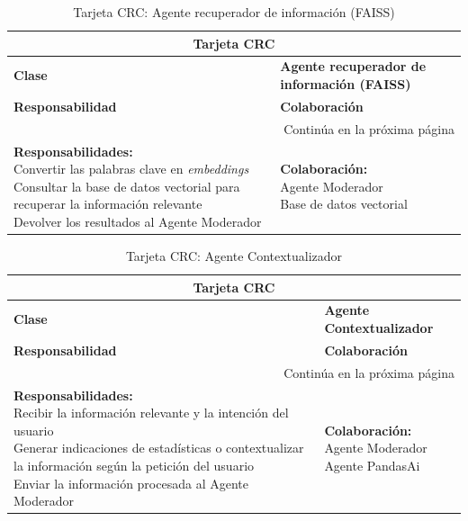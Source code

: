\begin{longtable}{|l|l|}
	\caption{Tarjeta CRC: Agente recuperador de información (FAISS) } \label{tablacrc2} \\
	
	\hline
	\multicolumn{2}{|c|}{\textbf{Tarjeta CRC}} \\
	\hline
	\textbf{Clase} & \textbf{Agente recuperador de información (FAISS)} \\
	\hline
	\endfirsthead
	
	\hline
	\textbf{Responsabilidad} & \textbf{Colaboración} \\
	\hline
	\endhead
	
	\hline
	\multicolumn{2}{|r|}{Continúa en la próxima página} \\
	\hline
	\endfoot
	
	\hline
	\endlastfoot
	
	\parbox[t]{0.45\linewidth}{\textbf{Responsabilidades:} \\ 
		Convertir las palabras clave en \textit{embeddings} \\ 
		Consultar la base de datos vectorial para recuperar la información relevante \\ 
		Devolver los resultados al Agente Moderador} 
	& 
	\parbox[t]{0.45\linewidth}{\textbf{Colaboración:} \\
		Agente Moderador \\ 
		Base de datos vectorial}
\end{longtable}

\begin{longtable}{|l|l|}
	\caption{Tarjeta CRC: Agente Contextualizador} \label{tablacrc3} \\
	
	\hline
	\multicolumn{2}{|c|}{\textbf{Tarjeta CRC}} \\
	\hline
	\textbf{Clase} & \textbf{Agente Contextualizador} \\
	\hline
	\endfirsthead
	
	\hline
	\textbf{Responsabilidad} & \textbf{Colaboración} \\
	\hline
	\endhead
	
	\hline
	\multicolumn{2}{|r|}{Continúa en la próxima página} \\
	\hline
	\endfoot
	
	\hline
	\endlastfoot
	
	\parbox[t]{0.45\linewidth}{\textbf{Responsabilidades:} \\ 
		Recibir la información relevante y la intención del usuario \\ 
		Generar indicaciones de estadísticas o contextualizar la información según la petición del usuario \\ 
		Enviar la información procesada al Agente Moderador} 
	& 
	\parbox[t]{0.45\linewidth}{\textbf{Colaboración:} \\
		Agente Moderador \\ 
		Agente PandasAi}
\end{longtable}


